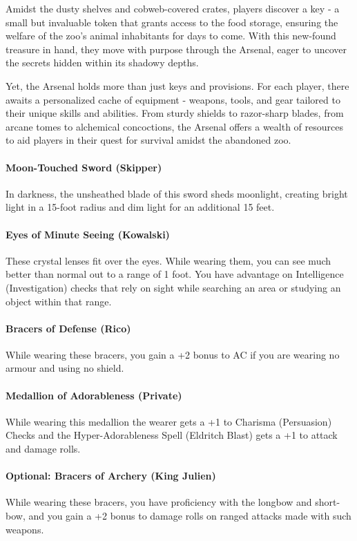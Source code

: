 Amidst the dusty shelves and cobweb-covered crates, players discover a key - a small but invaluable token that grants access to the food storage, ensuring the welfare of the zoo's animal inhabitants for days to come. With this new-found treasure in hand, they move with purpose through the Arsenal, eager to uncover the secrets hidden within its shadowy depths.

Yet, the Arsenal holds more than just keys and provisions. For each player, there awaits a personalized cache of equipment - weapons, tools, and gear tailored to their unique skills and abilities. From sturdy shields to razor-sharp blades, from arcane tomes to alchemical concoctions, the Arsenal offers a wealth of resources to aid players in their quest for survival amidst the abandoned zoo.

\paragraph*{Moon-Touched Sword (Skipper)}
In darkness, the unsheathed blade of this sword sheds moonlight, creating bright light in a 15-foot radius and dim light for an additional 15 feet.

\paragraph*{Eyes of Minute Seeing (Kowalski)}
These crystal lenses fit over the eyes. While wearing them, you can see much better than normal out to a range of 1 foot. You have advantage on Intelligence (Investigation) checks that rely on sight while searching an area or studying an object within that range.

\paragraph*{Bracers of Defense (Rico)}
While wearing these bracers, you gain a +2 bonus to AC if you are wearing no armour and using no shield.

\paragraph*{Medallion of Adorableness (Private)}
While wearing this medallion the wearer gets a +1 to Charisma (Persuasion) Checks and the Hyper-Adorableness Spell (Eldritch Blast) gets a +1 to attack and damage rolls.

\paragraph*{Optional: Bracers of Archery (King Julien)}
While wearing these bracers, you have proficiency with the longbow and short-bow, and you gain a +2 bonus to damage rolls on ranged attacks made with such weapons.

